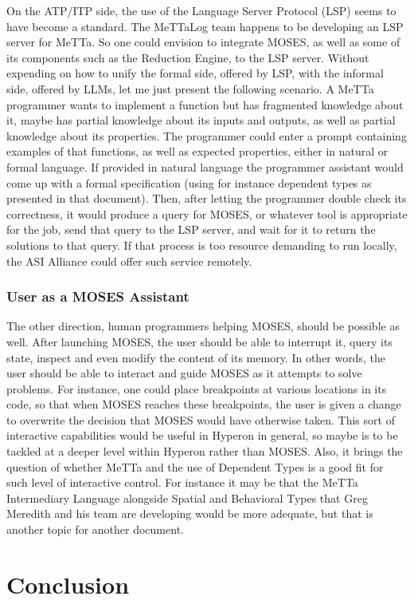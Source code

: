 \documentclass[]{report}
\begin{document}
On the ATP/ITP side, the use of the Language Server Protocol (LSP)
seems to have become a standard.  The MeTTaLog team happens to be
developing an LSP server for MeTTa.  So one could envision to
integrate MOSES, as well as some of its components such as the
Reduction Engine, to the LSP server.  Without expending on how to
unify the formal side, offered by LSP, with the informal side, offered
by LLMs, let me just present the following scenario.  A MeTTa
programmer wants to implement a function but has fragmented knowledge
about it, maybe has partial knowledge about its inputs and outputs, as
well as partial knowledge about its properties.  The programmer could
enter a prompt containing examples of that functions, as well as
expected properties, either in natural or formal language.  If
provided in natural language the programmer assistant would come up
with a formal specification (using for instance dependent types as
presented in that document).  Then, after letting the programmer
double check its correctness, it would produce a query for MOSES, or
whatever tool is appropriate for the job, send that query to the LSP
server, and wait for it to return the solutions to that query.  If
that process is too resource demanding to run locally, the ASI
Alliance could offer such service remotely.

\subsection{User as a MOSES Assistant}

The other direction, human programmers helping MOSES, should be
possible as well.  After launching MOSES, the user should be able to
interrupt it, query its state, inspect and even modify the content of
its memory.  In other words, the user should be able to interact and
guide MOSES as it attempts to solve problems.  For instance, one could
place breakpoints at various locations in its code, so that when MOSES
reaches these breakpoints, the user is given a change to overwrite the
decision that MOSES would have otherwise taken.  This sort of
interactive capabilities would be useful in Hyperon in general, so
maybe is to be tackled at a deeper level within Hyperon rather than
MOSES.  Also, it brings the question of whether MeTTa and the use of
Dependent Types is a good fit for such level of interactive control.
For instance it may be that the MeTTa Intermediary Language alongside
Spatial and Behavioral Types that Greg Meredith and his team are
developing would be more adequate, but that is another topic for
another document.

\chapter{Conclusion}

 
\end{document}
